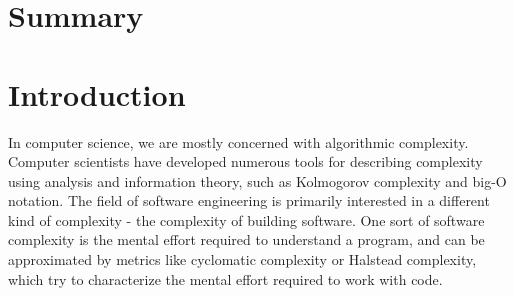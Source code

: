 \documentclass[12pt,initial,twoside,maitrise]{dms}
\numberwithin{equation}{section}
\numberwithin{table}{chapter}
\numberwithin{figure}{chapter}
\begin{document}

\chapter*{Summary}


\anglais
\cleardoublepage
{}  %
\tableofcontents
\cleardoublepage
{}  %
\listoftables
\cleardoublepage
{}
\listoffigures

\NoChapterPageNumber
\cleardoublepage
{}

\chapter{Introduction}


In computer science, we are mostly concerned with algorithmic complexity. Computer scientists have developed numerous tools for describing complexity using analysis and information theory, such as Kolmogorov complexity and big-O notation. The field of software engineering is primarily interested in a different kind of complexity - the complexity of building software. One sort of software complexity is the mental effort required to understand a program, and can be approximated by metrics like cyclomatic complexity or Halstead complexity, which try to characterize the mental effort required to work with code.
\end{document}
